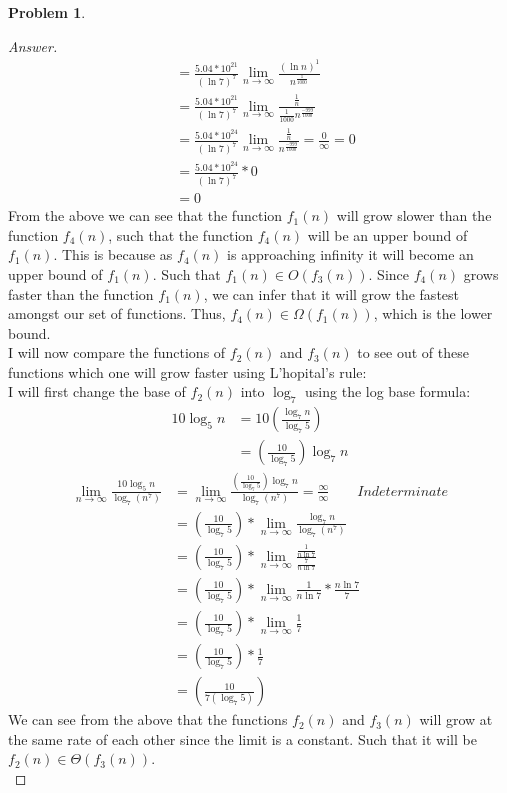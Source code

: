 \documentclass[11pt]{article}
\theoremstyle{definition}
\theoremstyle{definition}
\newtheorem{required}{Problem}
\theoremstyle{definition}
\begin{document}
\begin{required}
\begin{enumerate} [label=(\alph*)]
\begin{proof}[Answer]
\begin{align*}
&= \frac{5.04*10^{21}}{(\ln 7)^{7}}\lim_{n \to \infty} \frac{(\ln n)^{1}}{n^{\frac{1}{1000}}} \\
&= \frac{5.04*10^{21}}{(\ln 7)^{7}}\lim_{n \to \infty} \frac{\frac{1}{n}}{\frac{1}{1000}n^{\frac{-999}{1000}}} \\
&= \frac{5.04*10^{24}}{(\ln 7)^{7}}\lim_{n \to \infty} \frac{\frac{1}{n}}{n^{\frac{-999}{1000}}} = \frac{0}{\infty} = 0\\
&= \frac{5.04*10^{24}}{(\ln 7)^{7}} * 0 \\
&= 0
\end{align*} 
From the above we can see that the function $f_1(n)$ will grow slower than the function $f_4(n)$, such that the function $f_4(n)$ will be an upper bound of $f_1(n)$. This is because as $f_4(n)$ is approaching infinity it will become an upper bound of $f_1(n)$.  Such that  $f_1(n) \in O(f_3(n))$. Since $f_4(n)$ grows faster than the function $f_1(n)$, we can infer that it will grow the fastest amongst our set of functions. Thus, $f_4(n) \in \Omega(f_1(n))$, which is the lower bound. \\

I will now compare the functions of $f_2(n)$ and $f_3(n)$ to see out of these functions which one will grow faster using L'hopital's rule: \\
I will first change the base of $f_2(n)$ into $\log_7$ using the log base formula: 
\begin{align*}
10\log_5n &= 10(\frac{\log_7n}{\log_7 5}) \\
&= (\frac{10}{\log_7 5})\log_7 n
\end{align*}
\begin{align*}
\lim_{n \to \infty} \frac{10\log_5n}{\log_7 (n^{7})} &= \lim_{n \to \infty} \frac{(\frac{10}{\log_7 5})\log_7 n}{\log_7 (n^{7})}  = \frac{\infty}{\infty} \qquad Indeterminate  \\
&= (\frac{10}{\log_7 5}) * \lim_{n \to \infty} \frac{\log_7 n}{\log_7 (n^{7})}\\
&= (\frac{10}{\log_7 5}) * \lim_{n \to \infty} \frac{\frac{1}{n\ln7}}{\frac{7}{n\ln7}}\\
&= (\frac{10}{\log_7 5}) * \lim_{n \to \infty} \frac{1}{n\ln7} * \frac{n\ln7}{7}\\
&= (\frac{10}{\log_7 5}) * \lim_{n \to \infty} \frac{1}{7}\\
&= (\frac{10}{\log_7 5}) * \frac{1}{7} \\
&= (\frac{10}{7(\log_7 5)}) 
\end{align*} 
We can see from the above that the functions $f_2(n)$ and $f_3(n)$ will grow at the same rate of each other since the limit is a constant. Such that it will be $f_2(n) \in \Theta(f_3(n))$. \\


\end{proof}
\end{enumerate}
\end{required}
\end{document}
